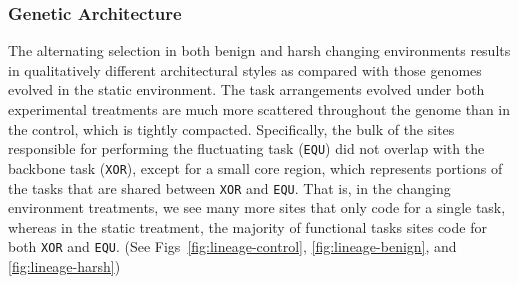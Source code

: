 \documentclass[10pt,letterpaper]{article}
\begin{document}


\subsubsection*{Genetic Architecture}
The alternating selection in both benign and harsh changing environments results in qualitatively different architectural styles as compared with those genomes evolved in the static environment. The task arrangements evolved under both experimental treatments are much more scattered throughout the genome than in the control, which is tightly compacted. Specifically, the bulk of the sites responsible for performing the fluctuating task (\texttt{EQU}) did not overlap with the backbone task (\texttt{XOR}), except for a small core region, which represents portions of the tasks that are shared between \texttt{XOR} and \texttt{EQU}. That is, in the changing environment treatments, we see many more sites that only code for a single task, whereas in the static treatment, the majority of functional tasks sites code for both \texttt{XOR} and \texttt{EQU}. (See Figs~\ref{fig:lineage-control}, \ref{fig:lineage-benign}, and \ref{fig:lineage-harsh})
\end{document}

